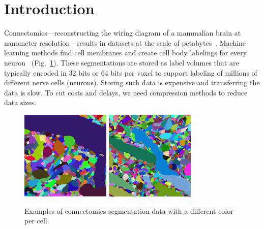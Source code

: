 \section{Introduction} \label{sec:i}

Connectomics---reconstructing the wiring diagram of a mammalian brain at nanometer resolution---results in datasets at the scale of petabytes~\cite{haehn_dojo_2014,suissapeleg2016}. Machine learning methods find cell membranes and create cell body labelings for every neuron~\cite{liu2014modular,GALA2014,ronneberger2015u} (Fig.~\ref{fig:data}).
These segmentations are stored as label volumes that are typically encoded in 32 bits or 64 bits per voxel to support labeling of millions of different nerve cells (neurons).  Storing such data is expensive and transferring the data is slow. To cut costs and delays, we need compression methods to reduce data sizes.


\begin{figure}[h]
	\begin{center}
		\includegraphics[width=0.38\textwidth]{gfx/ac3.png}%
		\hspace{0.12\textwidth}
		\includegraphics[width=0.38\textwidth]{gfx/cyl.png}%
	\end{center}
\caption{Examples of connectomics segmentation data with a different color per cell.}
\label{fig:data}
\end{figure}

